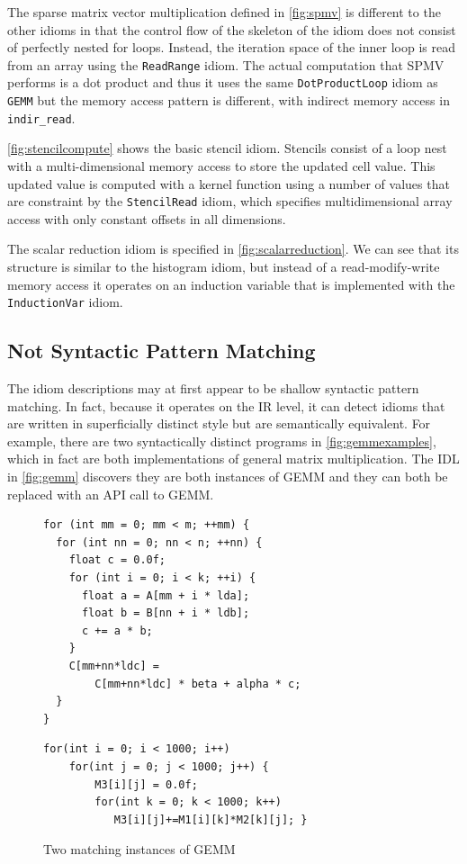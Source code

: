 The sparse matrix vector multiplication defined in \autoref{fig:spmv} is different to the other idioms in that
the control flow of the skeleton of the idiom does not consist of perfectly nested for loops.
Instead, the iteration space of the inner loop is read from an array using the \texttt{ReadRange} idiom.
The actual computation that SPMV performs is a dot product and thus it uses the same \texttt{DotProductLoop} idiom as
\texttt{GEMM} but the memory access pattern is different, with indirect memory access in \texttt{indir\_read}.

    \autoref{fig:stencilcompute} shows the basic stencil idiom.
    Stencils consist of a loop nest with a multi-dimensional memory access to
    store the updated cell value.
    This updated value is computed with a kernel function using a number of
    values that are constraint by the
    \texttt{StencilRead} idiom, which specifies multidimensional array access
    with only constant offsets in all dimensions.

The scalar reduction idiom is specified in \autoref{fig:scalarreduction}.
We can see that its structure is similar to the histogram idiom, but instead of a read-modify-write memory access
it operates on an induction variable that is implemented with the \texttt{InductionVar} idiom.

\subsection{Not Syntactic Pattern Matching}
The idiom descriptions may at first appear to be shallow syntactic pattern matching.
In fact, because it operates on the IR level, it can detect idioms that are written in superficially distinct style but are semantically equivalent.
For example, there are two syntactically distinct programs in \autoref{fig:gemmexamples}, which in fact are both implementations of general matrix multiplication.
The IDL in \autoref{fig:gemm} discovers they are both instances of GEMM and they can both be replaced with an API call to GEMM.

\begin{figure}[ht]
\begin{lstlisting}[numbers=none,basicstyle=\linespread{1.133}\footnotesize\ttfamily]
for (int mm = 0; mm < m; ++mm) {
  for (int nn = 0; nn < n; ++nn) {
    float c = 0.0f;
    for (int i = 0; i < k; ++i) {
      float a = A[mm + i * lda]; 
      float b = B[nn + i * ldb];
      c += a * b;
    }
    C[mm+nn*ldc] =
        C[mm+nn*ldc] * beta + alpha * c;
  }
}
\end{lstlisting}
\vspace{1em}
\begin{lstlisting}[numbers=none,basicstyle=\linespread{1.133}\footnotesize\ttfamily]
for(int i = 0; i < 1000; i++)
    for(int j = 0; j < 1000; j++) {
        M3[i][j] = 0.0f;
        for(int k = 0; k < 1000; k++)
           M3[i][j]+=M1[i][k]*M2[k][j]; }
\end{lstlisting}
\vspace{-0.3cm}
\caption{Two matching instances of GEMM}
\label{fig:gemmexamples}
\end{figure}


